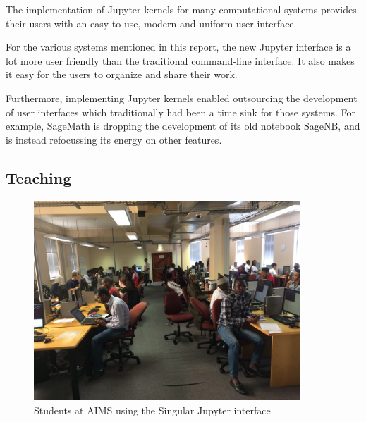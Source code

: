 \documentclass{deliverablereport}
\begin{document}
The implementation of Jupyter kernels for many computational systems
provides their users with an easy-to-use, modern and uniform user interface.

For the various systems mentioned in this report,
the new Jupyter interface is a lot more user friendly than the traditional
command-line interface.
It also makes it easy for the users to organize and share their work.

Furthermore, implementing Jupyter kernels enabled outsourcing the development of user interfaces
which traditionally had been a time sink for those systems.
For example, SageMath is dropping the development of its old notebook SageNB,
and is instead refocussing its energy on other features.

\subsection{Teaching}\label{teaching}

\begin{figure}\label{AIMS}
\includegraphics[width=100mm]{IMG-20180124-WA0000.jpg}
\caption{Students at AIMS using the Singular Jupyter interface}
\end{figure}
\end{document}
